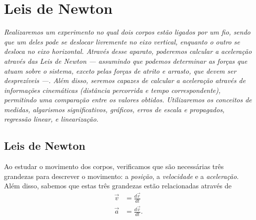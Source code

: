 \chapter{Leis de Newton}
\label{Chap:ExpLeisDeNewton}

\begin{fullwidth}\it
	Realizaremos um experimento no qual dois corpos estão ligados por um fio, sendo que um deles pode se deslocar livremente no eixo vertical, enquanto o outro se desloca no eixo horizontal. Através desse aparato, poderemos calcular a aceleração através das Leis de Newton --- assumindo que podemos determinar as forças que atuam sobre o sistema, exceto pelas forças de atrito e arrasto, que devem ser desprezíveis ---. Além disso, seremos capazes de calcular a aceleração através de informações cinemáticas (distância percorrida e tempo correspondente), permitindo uma comparação entre os valores obtidos. Utilizaremos os conceitos de medidas, algarismos significativos, gráficos, erros de escala e propagados, regressão linear, e linearização.
\end{fullwidth}

\section{Leis de Newton}

Ao estudar o movimento dos corpos, verificamos que são necessárias três grandezas para descrever o movimento: a \emph{posição}, a \emph{velocidade} e a \emph{aceleração}. Além disso, sabemos que estas três grandezas estão relacionadas através de
\begin{align}
	\vec{v} &= \frac{d\vec{r}}{dt} \\
	\vec{a} &= \frac{d\vec{v}}{dt}.
\end{align}

